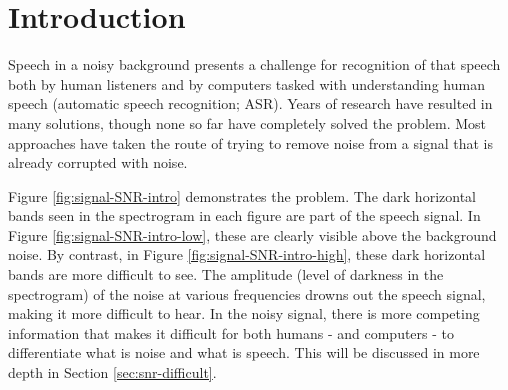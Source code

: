 % 
% 
% 

\chapter{Introduction\label{chapter1}}

Speech in a noisy background presents a challenge for recognition of that speech both by human listeners and by computers tasked with understanding human speech (automatic speech recognition; ASR).  Years of research have resulted in many solutions, though none so far have completely solved the problem.  Most approaches have taken the route of trying to remove noise from a signal that is already corrupted with noise.

Figure \ref{fig:signal-SNR-intro} demonstrates the problem.  The dark horizontal bands seen in the spectrogram in each figure are part of the speech signal.  In Figure \ref{fig:signal-SNR-intro-low}, these are clearly visible above the background noise.  By contrast, in Figure \ref{fig:signal-SNR-intro-high}, these dark horizontal bands are more difficult to see.  The amplitude (level of darkness in the spectrogram) of the noise at various frequencies drowns out the speech signal, making it more difficult to hear.  In the noisy signal, there is more competing information that makes it difficult for both humans - and computers - to differentiate what is noise and what is speech.  This will be discussed in more depth in Section \ref{sec:snr-difficult}.

